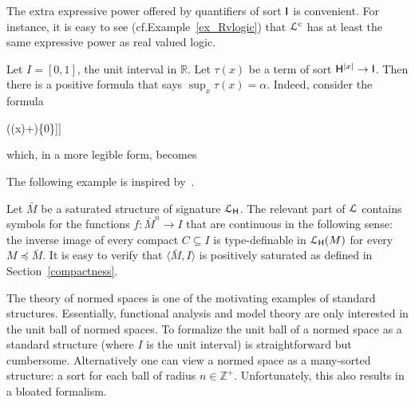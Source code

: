\documentclass[10pt,oneside]{amsproc}
\def\dotminus{\stackon[.2ex]{$-$}{$.$}}
\begin{document}
The extra expressive power offered by quantifiers of sort ${\sf I}$ is convenient.
For instance, it is easy to see (cf.\@ Example~\ref{ex_Rvlogic}) that ${\EuScript L}^{\rm c}$ has at least the same expressive power as real valued logic.%

\begin{example}\label{ex_Rvlogic}
  Let $I=[0,1]$, the unit interval in $\mathds{R}$.
  Let $\tau(x)$ be a term of sort ${\sf H}^{|x|}\to {\sf I}$.
  Then there is a positive formula that says $\sup_x \tau(x)=\alpha$.
  Indeed, consider the formula

  \ceq{\hfill\ x\ \big[\tau(x)\dotminus\alpha\in\{0\}\big]}
  {\wedge}{\forall \varepsilon \Big[\varepsilon\in\{0\}\ \vee\ \exists x\ \big[\alpha\dotminus (\tau(x)+\varepsilon)\in\{0\}\big]\Big]}

  which, in a more legible form, becomes

\end{example}

The following example is inspired by~\cite{HPP}.

\begin{example}\label{ex_HPP}
  Let $\bar M$ be a saturated structure of signature ${\EuScript L}_{\sf H}$.
  The relevant part of ${\EuScript L}$ contains symbols for the functions $f:\bar M^n\to I$ that are continuous in the following sense: the inverse image of every compact $C\subseteq I$ is type-definable in ${\EuScript L}_{\sf H}(M)$ for every $M\preceq\bar M$.
  It is easy to verify that $\langle\bar M, I\rangle$ is positively saturated as defined in Section~\ref{compactness}.
\end{example}

The theory of normed spaces is one of the motivating examples of standard structures.
Essentially, functional analysis and model theory are only interested in the unit ball of normed spaces.
To formalize the unit ball of a normed space as a standard structure (where $I$ is the unit interval) is straightforward but cumbersome.
Alternatively one can view a normed space as a many-sorted structure: a sort for each ball of radius $n\in\mathds{Z}^+$.
Unfortunately, this also results in a bloated formalism.
\end{document}
